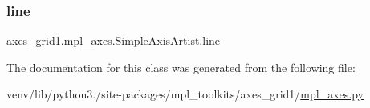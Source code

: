 \subsubsection{\texorpdfstring{line}{line}}
{\footnotesize\ttfamily axes\+\_\+grid1.\+mpl\+\_\+axes.\+Simple\+Axis\+Artist.\+line}



The documentation for this class was generated from the following file\+:\begin{DoxyCompactItemize}
\item 
venv/lib/python3./site-\/packages/mpl\+\_\+toolkits/axes\+\_\+grid1/\hyperlink{mpl__axes_8py}{mpl\+\_\+axes.\+py}\end{DoxyCompactItemize}
